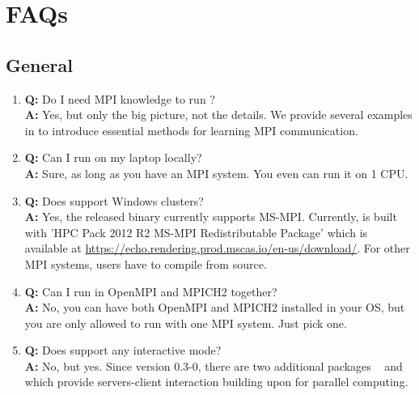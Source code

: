 

\section[FAQs]{FAQs}
\label{sec:faqs}


\subsection[General]{General}
\label{sec:general}

\begin{enumerate}
\item {\bf\color{blue} Q:}
      Do I need MPI knowledge to run ? \\
      {\bf\color{blue} A:}
      Yes, but only the big picture, not the details. We provide
      several examples in  to
      introduce essential methods for learning MPI communication.

\item {\bf\color{blue} Q:}
      Can I run  on my laptop locally? \\
      {\bf\color{blue} A:}
      Sure, as long as you have an MPI system. You even can run it on 1 CPU.

\item {\bf\color{blue} Q:}
      Does  support Windows clusters? \\
      {\bf\color{blue} A:}
      Yes, the released binary currently supports MS-MPI.
      Currently,  is built with
      'HPC Pack 2012 R2 MS-MPI Redistributable Package' which is available
      at \url{https://echo.rendering.prod.mscas.io/en-us/download/}.
      For other MPI systems, users have to compile from source.

\item {\bf\color{blue} Q:}
      Can I run  in OpenMPI and MPICH2 together? \\
      {\bf\color{blue} A:}
      No, you can have both OpenMPI and MPICH2 installed in your OS, but
      you are only allowed to run  with one MPI system.
      Just pick one.

\item {\bf\color{blue} Q:}
      Does  support any interactive mode? \\
      {\bf\color{blue} A:}
      No, but yes. Since  version 0.3-0, there are two additional
      packages ~\citep{Chen2015pbdZMQpackage} and
      ~\citep{Schmidt2015pbdCSpackage}
      which provide servers-client interaction building upon
       for parallel computing.


\end{enumerate}

